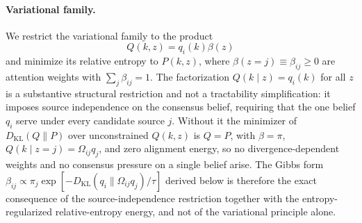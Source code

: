 \documentclass[11pt]{article}
\begin{document}
\paragraph{Variational family.}
We restrict the variational family to the product
\begin{equation}
Q(k, z) = q_i(k) \beta(z)
\label{eq:mixture_posterior}
\end{equation}
and minimize its relative entropy to $P(k,z)$, where $\beta(z = j) \equiv \beta_{ij} \geq 0$ are attention weights with $\sum_j \beta_{ij} = 1$. The factorization $Q(k \mid z) = q_i(k)$ for all $z$ is a substantive structural restriction and not a tractability simplification: it imposes source independence on the consensus belief, requiring that the one belief $q_i$ serve under every candidate source $j$. Without it the minimizer of $D_{\mathrm{KL}}(Q \| P)$ over unconstrained $Q(k,z)$ is $Q = P$, with $\beta = \pi$, $Q(k \mid z{=}j) = \Omega_{ij}q_j$, and zero alignment energy, so no divergence-dependent weights and no consensus pressure on a single belief arise. The Gibbs form $\beta_{ij} \propto \pi_j \exp[-D_{\mathrm{KL}}(q_i \| \Omega_{ij}q_j)/\tau]$ derived below is therefore the exact consequence of the source-independence restriction together with the entropy-regularized relative-entropy energy, and not of the variational principle alone.
\end{document}
